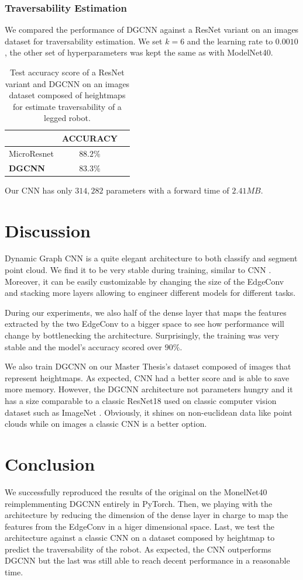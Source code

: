 \documentclass[twocolumn,showpacs,
  nofootinbib,aps,superscriptaddress,
  eqsecnum,prd,notitlepage,showkeys,10pt]{revtex4-1}
\begin{document}
\subsubsection{Traversability Estimation}
We compared the performance of DGCNN against a ResNet \cite{he2015deep} variant on an images dataset for traversability estimation. We set $k=6$ and the learning rate to $0.0010$, the other set of hyperparameters was kept the same as with ModelNet40.
\begin{table}[H]
  \centering
  \begin{tabular}{lcc}
    & ACCURACY \\
    \hline
    MicroResnet & $88.2$\%  \\
    \textbf{DGCNN} & $83.3$\%  \\
    \hline
  \end{tabular}
  \caption{Test accuracy score of a ResNet variant and DGCNN on an images dataset composed of heightmaps for estimate traversability of a legged robot.}
\end{table}
Our CNN has only $314,282$ parameters with a forward time of $2.41MB$.
\section{Discussion}
Dynamic Graph CNN is a quite elegant architecture to both classify and segment point cloud. We find it to be very stable during training, similar to CNN . Moreover, it can be easily customizable by changing the size of the EdgeConv and stacking more layers allowing to engineer different models for different tasks.

During our experiments, we also half of the dense layer that maps the features extracted by the two EdgeConv to a bigger space to see how performance will change by bottlenecking the architecture. Surprisingly, the training was very stable and the model's accuracy scored over $90\%$. 

We also train DGCNN on our Master Thesis's dataset composed of images that represent heightmaps. As expected, CNN had a better score and is able to save more memory. However, the DGCNN architecture not parameters hungry and it has a size comparable to a classic ResNet18 used on classic computer vision dataset such as ImageNet \cite{imagenet}. Obviously, it shines on non-euclidean data like point clouds while on images a classic CNN is a better option. 

\section{Conclusion}
We successfully reproduced the results of the original on the MonelNet40 reimplemmenting DGCNN entirely in PyTorch. Then, we playing with the architecture by reducing the dimension of the dense layer in charge to map the features from the EdgeConv in a higer dimensional space. Last, we test the architecture against a classic CNN on a dataset composed by heightmap to predict the traversability of the robot. As expected, the CNN outperforms DGCNN but the last was still able to reach decent performance in a reasonable time.
\newpage

\end{document}
